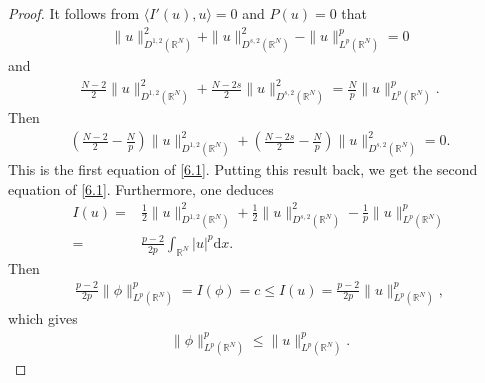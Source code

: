 \documentclass[12pt,a4paper,reqno]{amsart}
\numberwithin{equation}{section}
\begin{document}
\begin{proof}
It follows from $\langle I'(u),u\rangle=0$ and $P(u)=0$ that
\begin{equation*}
\begin{aligned}
\|u\|_{D^{1,2}(\mathbb{R}^{N})}^{2}
+
\|u\|_{D^{s,2}(\mathbb{R}^{N})}^{2}
-
\|u\|_{L^{p}(\mathbb{R}^{N})}^{p}
=0
\end{aligned}
\end{equation*}
and
\begin{equation*}
\begin{aligned}
\frac{N-2}{2}
\|u\|^{2}_{D^{1,2}(\mathbb{R}^{N})}
+
\frac{N-2s}{2}
\|u\|^{2}_{D^{s,2}(\mathbb{R}^{N})}
=\frac{N}{p}\|u\|_{L^{p}(\mathbb{R}^{N})}^{p}.
\end{aligned}
\end{equation*}
Then
\begin{equation}\label{6.2}
\begin{aligned}
\left(
\frac{N-2}{2}
-\frac{N}{p}
\right)
\|u\|^{2}_{D^{1,2}(\mathbb{R}^{N})}
+
\left(
\frac{N-2s}{2}
-\frac{N}{p}
\right)
\|u\|^{2}_{D^{s,2}(\mathbb{R}^{N})}
=0.
\end{aligned}
\end{equation}
This is the first equation of \eqref{6.1}.
Putting this result back, we get the second equation of \eqref{6.1}.
Furthermore, one deduces
\begin{equation*}
\begin{aligned}
I(u)
=&
\frac{1}{2}
\|u\|_{D^{1,2}(\mathbb{R}^{N})}^{2}
+
\frac{1}{2}
\|u\|_{D^{s,2}(\mathbb{R}^{N})}^{2}
-
\frac{1}{p}
\|u\|_{L^{p}(\mathbb{R}^{N})}^{p}\\
=&
\frac{p-2}{2p}
\int_{\mathbb{R}^{N}}
|u|^{p}
\mathrm{d}x.
\end{aligned}
\end{equation*}
Then
\begin{equation*}
\begin{aligned}
\frac{p-2}{2p}
\|\phi\|_{L^{p}(\mathbb{R}^{N})}^{p}
=
I(\phi)=c
\leqslant
I(u)
=
\frac{p-2}{2p}
\|u\|_{L^{p}(\mathbb{R}^{N})}^{p},
\end{aligned}
\end{equation*}
which gives
\begin{equation*}
\begin{aligned}
\|\phi\|_{L^{p}(\mathbb{R}^{N})}^{p}
\leqslant
\|u\|_{L^{p}(\mathbb{R}^{N})}^{p}.
\end{aligned}
\end{equation*}
\end{proof}
\end{document}
